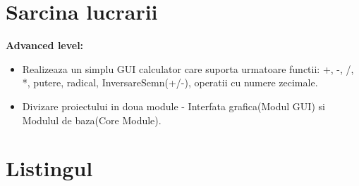 \documentclass[12pt]{article}
\begin{document}
\section* {Sarcina lucrarii}
\textbf{Advanced level:}
\begin{itemize}
\item Realizeaza un simplu GUI calculator care suporta urmatoare functii: +, -, /, *, putere, radical, InversareSemn(+/-), operatii cu numere zecimale.
\item Divizare proiectului in doua module - Interfata grafica(Modul GUI) si Modulul de baza(Core Module).
\end{itemize}

\section {Listingul}
\end{document}
